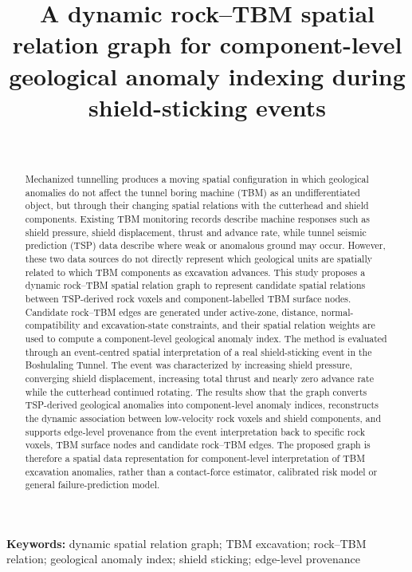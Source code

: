 \documentclass{tGIS2e}
\title{A dynamic rock--TBM spatial relation graph for component-level geological anomaly indexing during shield-sticking events}
\author{
\name{First Author\textsuperscript{a}\thanks{Email: first.author@example.com} and
Second Author\textsuperscript{b}} \\
\affil{\textsuperscript{a}Department of XXX, University A, City, Country; \\
\textsuperscript{b}Institute of YYY, University B, City, Country}
}
\newenvironment{keywords}{\par\noindent\textbf{Keywords: }}{\par}
\begin{document}
\maketitle

\begin{abstract}
Mechanized tunnelling produces a moving spatial configuration in which geological anomalies do not affect the tunnel boring machine (TBM) as an undifferentiated object, but through their changing spatial relations with the cutterhead and shield components. Existing TBM monitoring records describe machine responses such as shield pressure, shield displacement, thrust and advance rate, while tunnel seismic prediction (TSP) data describe where weak or anomalous ground may occur. However, these two data sources do not directly represent which geological units are spatially related to which TBM components as excavation advances. This study proposes a dynamic rock--TBM spatial relation graph to represent candidate spatial relations between TSP-derived rock voxels and component-labelled TBM surface nodes. Candidate rock--TBM edges are generated under active-zone, distance, normal-compatibility and excavation-state constraints, and their spatial relation weights are used to compute a component-level geological anomaly index. The method is evaluated through an event-centred spatial interpretation of a real shield-sticking event in the Boshulaling Tunnel. The event was characterized by increasing shield pressure, converging shield displacement, increasing total thrust and nearly zero advance rate while the cutterhead continued rotating. The results show that the graph converts TSP-derived geological anomalies into component-level anomaly indices, reconstructs the dynamic association between low-velocity rock voxels and shield components, and supports edge-level provenance from the event interpretation back to specific rock voxels, TBM surface nodes and candidate rock--TBM edges. The proposed graph is therefore a spatial data representation for component-level interpretation of TBM excavation anomalies, rather than a contact-force estimator, calibrated risk model or general failure-prediction model.

\end{abstract}

\begin{keywords}
dynamic spatial relation graph; TBM excavation; rock--TBM relation; geological anomaly index; shield sticking; edge-level provenance
\end{keywords}
\end{document}
